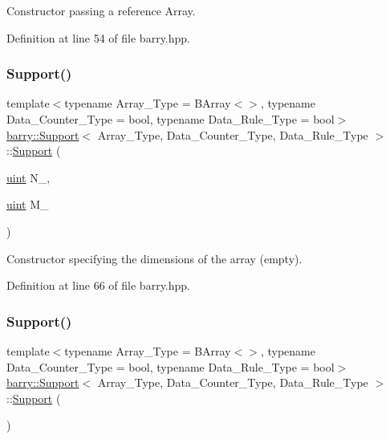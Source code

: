 Constructor passing a reference Array. 



Definition at line 54 of file barry.\+hpp.

\mbox{\label{classbarry_1_1_support_a0deea9b8e83fd418dfad59fb4cfb2ad5}} 
\subsubsection{\texorpdfstring{Support()}{Support()}\hspace{0.1cm}{\footnotesize\ttfamily [2/3]}}
{\footnotesize\ttfamily template$<$typename Array\+\_\+\+Type = B\+Array$<$$>$, typename Data\+\_\+\+Counter\+\_\+\+Type = bool, typename Data\+\_\+\+Rule\+\_\+\+Type = bool$>$ \\
\hyperlink{classbarry_1_1_support}{barry\+::\+Support}$<$ Array\+\_\+\+Type, Data\+\_\+\+Counter\+\_\+\+Type, Data\+\_\+\+Rule\+\_\+\+Type $>$\+::\hyperlink{classbarry_1_1_support}{Support} (\begin{DoxyParamCaption}\item[{\hyperlink{namespacebarry_a11dfc53ddb4672278319aa04f1e09a6c}{uint}}]{N\+\_\+,  }\item[{\hyperlink{namespacebarry_a11dfc53ddb4672278319aa04f1e09a6c}{uint}}]{M\+\_\+ }\end{DoxyParamCaption})\hspace{0.3cm}{\ttfamily [inline]}}



Constructor specifying the dimensions of the array (empty). 



Definition at line 66 of file barry.\+hpp.

\mbox{\label{classbarry_1_1_support_a08a48546e91c5259a26be4cde31ef902}} 
\subsubsection{\texorpdfstring{Support()}{Support()}\hspace{0.1cm}{\footnotesize\ttfamily [3/3]}}
{\footnotesize\ttfamily template$<$typename Array\+\_\+\+Type = B\+Array$<$$>$, typename Data\+\_\+\+Counter\+\_\+\+Type = bool, typename Data\+\_\+\+Rule\+\_\+\+Type = bool$>$ \\
\hyperlink{classbarry_1_1_support}{barry\+::\+Support}$<$ Array\+\_\+\+Type, Data\+\_\+\+Counter\+\_\+\+Type, Data\+\_\+\+Rule\+\_\+\+Type $>$\+::\hyperlink{classbarry_1_1_support}{Support} (\begin{DoxyParamCaption}{ }\end{DoxyParamCaption})\hspace{0.3cm}{\ttfamily [inline]}}



